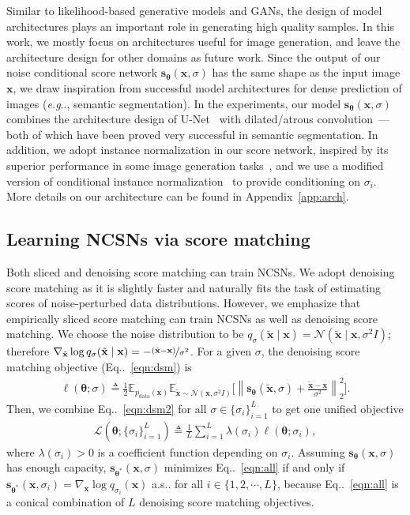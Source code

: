 \documentclass{article}
\makeatletter
\newcommand{\mbb}[1]{\mathbb{#1}}
\newcommand{\mcal}{\mathcal}
\newcommand{\norm}[1]{\left\lVert#1\right\rVert}
\def\@onedot{\ifx\@let@token.\else.\null\fi\xspace}
\DeclareRobustCommand\onedot{\futurelet\@let@token\@onedot}
\newcommand{\eqnref}[1]{Eq\onedot~\eqref{#1}}
\newcommand{\bfx}{\mathbf{x}}
\newcommand{\bftheta}{{\boldsymbol{\theta}}}
\newcommand{\bfs}{\mathbf{s}}
\def\eg{\emph{e.g}\onedot}
\def\as{a.s\onedot}
\makeatother
\begin{document}
Similar to likelihood-based generative models and GANs, the design of model architectures plays an important role in generating high quality samples. In this work, we mostly focus on architectures useful for image generation, and leave the architecture design for other domains as future work. Since the output of our noise conditional score network $\bfs_\bftheta(\bfx, \sigma)$ has the same shape as the input image $\bfx$, we draw inspiration from successful model architectures for dense prediction of images (\eg, semantic segmentation). In the experiments, our model $\bfs_\bftheta(\bfx, \sigma)$ combines the architecture design of U-Net~\cite{ronneberger2015unet} with dilated/atrous convolution~\cite{Yu2016,Yu2017,chen2017deeplab}---both of which have been proved very successful in semantic segmentation. In addition, we adopt instance normalization in our score network, inspired by its superior performance in some image generation tasks~\cite{ulyanov2016instance,dumoulin2017learned-iclr,huang2017arbitrary}, and we use a modified version of conditional instance normalization~\cite{dumoulin2017learned-iclr} to provide conditioning on $\sigma_i$. More details on our architecture can be found in Appendix~\ref{app:arch}.

\subsection{Learning NCSNs via score matching}

Both sliced and denoising score matching can train NCSNs. We adopt denoising score matching as it is slightly faster and naturally fits the task of estimating scores of noise-perturbed data distributions. However, we emphasize that empirically sliced score matching can train NCSNs as well as denoising score matching. We choose the noise distribution to be $q_\sigma(\tilde{\bfx} \mid \bfx) = \mcal{N}(\tilde{\bfx} \mid \bfx, \sigma^2 I)$; therefore $\nabla_{\tilde{\bfx}} \log q_\sigma(\tilde{\bfx} \mid \bfx) = -\nicefrac{(\tilde{\bfx} - \bfx)}{\sigma^2}$. For a given $\sigma$, the denoising score matching objective (\eqnref{eqn:dsm}) is
\begin{align}
 \ell(\bftheta; \sigma) \triangleq \frac{1}{2}\mbb{E}_{p_\text{data}(\bfx)} \mbb{E}_{\tilde{\bfx}\sim \mcal{N}(\bfx,\sigma^2 I)} \bigg[\norm{ \bfs_\bftheta(\tilde{\bfx}, \sigma) + \frac{\tilde{\bfx} - \bfx}{\sigma^2}}_2^2\bigg]. \label{eqn:dsm2}
\end{align}
Then, we combine \eqnref{eqn:dsm2} for all $\sigma \in \{\sigma_i\}_{i=1}^L$ to get one unified objective
\begin{align}
    \mcal{L}(\bftheta; \{\sigma_i\}_{i=1}^L) \triangleq \frac{1}{L}\sum_{i=1}^L \lambda(\sigma_i)\ell(\bftheta; \sigma_i), \label{eqn:all}
\end{align}
where $\lambda(\sigma_i) > 0$ is a coefficient function depending on $\sigma_i$. Assuming $\bfs_\bftheta(\bfx, \sigma)$ has enough capacity, $\bfs_{\bftheta^*}(\bfx, \sigma)$ minimizes \eqnref{eqn:all} if and only if $\bfs_{\bftheta^*}(\bfx, \sigma_i) = \nabla_\bfx \log q_{\sigma_i}(\bfx)$ \as for all $i \in \{1,2,\cdots, L\}$, because \eqnref{eqn:all} is a conical combination of $L$ denoising score matching objectives.
\end{document}
